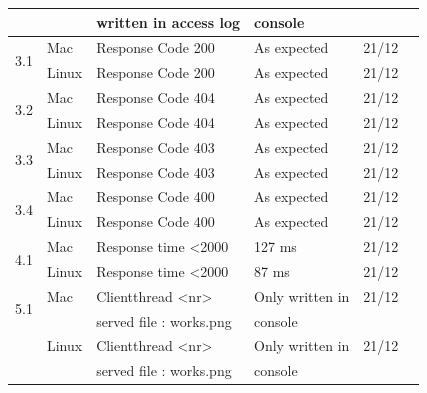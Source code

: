 \documentclass[a4paper, 12pt]{article}
\newcommand{\cmark}{\ding{51}}%
\newcommand{\xmark}{\ding{55}}%
\begin{document}
\begin{tabular}{| c | l | l | l | l | c |}
			&		& written in access log		& console		& 		& 		\\ \hline
\multirow{2}{*}{3.1}	& Mac		& Response Code 200		& As expected 		& 21/12		& \cmark	\\
\cline{2-6}		& Linux		& Response Code 200		& As expected 		& 21/12		& \cmark	\\ \hline
\multirow{2}{*}{3.2}	& Mac		& Response Code 404 		& As expected 		& 21/12		& \cmark	\\
\cline{2-6}		& Linux		& Response Code 404		& As expected 		& 21/12		& \cmark	\\ \hline
\multirow{2}{*}{3.3}	& Mac		& Response Code 403		& As expected 		& 21/12		& \cmark	\\
\cline{2-6}		& Linux		& Response Code 403		& As expected 		& 21/12		& \cmark	\\ \hline
\multirow{2}{*}{3.4}	& Mac		& Response Code 400		& As expected 		& 21/12		& \cmark	\\
\cline{2-6}		& Linux		& Response Code 400		& As expected 		& 21/12		& \cmark	\\ \hline
\multirow{2}{*}{4.1}	& Mac		& Response time <2000		& 127 ms		& 21/12		& \cmark	\\
\cline{2-6}		& Linux		& Response time <2000		& 87 ms			& 21/12		& \cmark	\\ \hline
\multirow{2}{*}{5.1}	& Mac		& Clientthread <nr>		& Only written in	& 21/12		& \xmark	\\
			&		& served file : works.png 	& console		&		&		\\
\cline{2-6}		& Linux		& Clientthread <nr>		& Only written in	& 21/12		& \xmark	\\
			&		& served file : works.png 	& console		&		&		\\ \hline
\end{tabular}

\newpage
\end{document}
